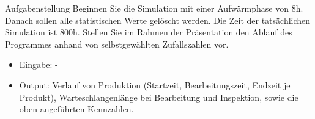 \begin{frame}{Aufgabenstellung}
Beginnen Sie die Simulation mit einer Aufwärmphase von 8h. Danach sollen alle statistischen
Werte gelöscht werden. Die Zeit der tatsächlichen Simulation ist 800h. Stellen Sie
im Rahmen der Präsentation den Ablauf des Programmes anhand von selbstgewählten
Zufallszahlen vor.

\begin{itemize}
  \item Eingabe: -
  \item Output: Verlauf von Produktion (Startzeit, Bearbeitungszeit, Endzeit je Produkt),
Warteschlangenlänge bei Bearbeitung und Inspektion, sowie die oben angeführten
Kennzahlen.
\end{itemize}
\end{frame}

